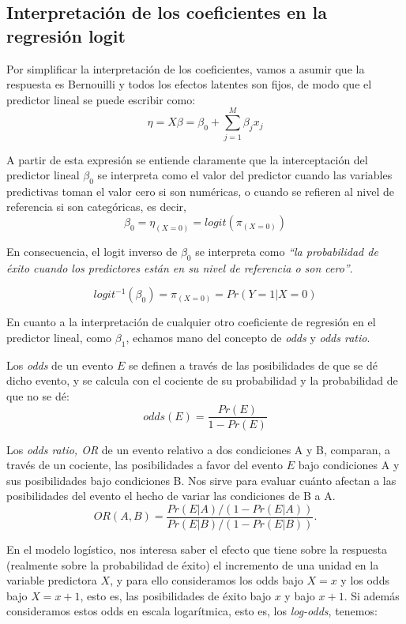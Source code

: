 \documentclass[
]{book}
\begin{document}
\hypertarget{interpretaciuxf3n-de-los-coeficientes-en-la-regresiuxf3n-logit}{%
\subsection{Interpretación de los coeficientes en la regresión logit}\label{interpretaciuxf3n-de-los-coeficientes-en-la-regresiuxf3n-logit}}

Por simplificar la interpretación de los coeficientes, vamos a asumir
que la respuesta es Bernouilli y todos los efectos latentes son fijos,
de modo que el predictor lineal se puede escribir como:
\[\eta=X\beta=\beta_0+\sum_{j=1}^M \beta_j x_{j}\]

A partir de esta expresión se entiende claramente que la interceptación
del predictor lineal \(\beta_0\) se interpreta como el valor del predictor
cuando las variables predictivas toman el valor cero si son numéricas, o
cuando se refieren al nivel de referencia si son categóricas, es decir,\\
\[\beta_0=\eta_{(X=0)}=logit(\pi_{(X=0)})\]

En consecuencia, el logit inverso de \(\beta_0\) se interpreta como \emph{``la
probabilidad de éxito cuando los predictores están en su nivel de
referencia o son cero''}.

\[logit^{-1}(\beta_0)=\pi_{(X=0)}=Pr(Y=1|X=0)\]

En cuanto a la interpretación de cualquier otro coeficiente de regresión
en el predictor lineal, como \(\beta_1\), echamos mano del concepto de
\emph{odds} y \emph{odds ratio}.

Los \emph{odds} de un evento \(E\) se definen a través de las posibilidades de
que se dé dicho evento, y se calcula con el cociente de su probabilidad
y la probabilidad de que no se dé: \[odds(E)=\frac{Pr(E)}{1-Pr(E)}\]

Los \emph{odds ratio, OR} de un evento relativo a dos condiciones A y B,
comparan, a través de un cociente, las posibilidades a favor del evento
\(E\) bajo condiciones A y sus posibilidades bajo condiciones B. Nos sirve
para evaluar cuánto afectan a las posibilidades del evento el hecho de
variar las condiciones de B a A.
\[OR(A,B)=\frac{Pr(E|A)/(1-Pr(E|A))}{Pr(E|B)/(1-Pr(E|B))}.\]

En el modelo logístico, nos interesa saber el efecto que tiene sobre la
respuesta (realmente sobre la probabilidad de éxito) el incremento de
una unidad en la variable predictora \(X\), y para ello consideramos los
odds bajo \(X=x\) y los odds bajo \(X=x+1\), esto es, las posibilidades de
éxito bajo \(x\) y bajo \(x+1\). Si además consideramos estos odds en escala
logarítmica, esto es, los \emph{log-odds}, tenemos:
\end{document}
